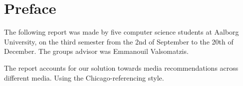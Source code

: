 \chapter*{Preface}
The following report was made by five computer science students at Aalborg University, on the third semester from the 2nd of September to the 20th of December. The groups advisor was Emmanouil Valsomatzis.


The report accounts for our solution towards media recommendations across different media. Using the Chicago-referencing style.

\null
\vfill
{}